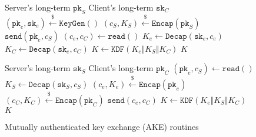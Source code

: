 \documentclass[journal=tches,submission]{iacrtrans}
\newcommand{\keygen}{\texttt{KeyGen}}
\newcommand{\encap}{\texttt{Encap}}
\newcommand{\decap}{\texttt{Decap}}
\newcommand{\pk}{\texttt{pk}}
\newcommand{\sk}{\texttt{sk}}
\newcommand{\leftsample}{\stackrel{\$}{\leftarrow}}
\begin{document}
\begin{figure}[h]
    \centering
    \begin{minipage}[b]{0.49\textwidth}
        \begin{algorithm}[H]
            \caption*{$\texttt{AKE}_\texttt{C}(\pk_S, \sk_C)$}
            \begin{algorithmic}[1]
                \Require Server's long-term $\pk_S$
                \Require Client's long-term $\sk_C$
                \State $(\pk_e, \sk_e) \leftsample \keygen()$
                \State $(c_S, K_S) \leftsample \encap(\pk_S)$
                \State $\texttt{send}(\pk_e, c_S)$
                \State $(c_e, c_C) \leftarrow \texttt{read}()$
                \State $K_e \leftarrow \decap(\sk_e, c_e)$
                \State $K_C \leftarrow \decap(\sk_e, c_C)$
                \State $K \leftarrow \texttt{KDF}(K_e \Vert K_S \Vert K_C)$
                \State \Return $K$
            \end{algorithmic}
        \end{algorithm}
    \end{minipage}
    \begin{minipage}[b]{0.49\textwidth}
        \begin{algorithm}[H]
            \caption*{$\texttt{AKE}_\texttt{S}(\sk_S, \pk_C)$}
            \begin{algorithmic}[1]
                \Require Server's long-term $\sk_S$
                \Require Client's long-term $\pk_C$
                \State $(\pk_e, c_S) \leftarrow \texttt{read}()$
                \State $K_S \leftarrow \decap(\sk_S, c_S)$
                \State $(c_e, K_e) \leftsample \encap(\pk_e)$
                \State $(c_C, K_C) \leftsample \encap(\pk_C)$
                \State $\texttt{send}(c_e, c_C)$
                \State $K \leftarrow \texttt{KDF}(K_e \Vert K_S \Vert K_C)$
                \State \Return $K$
            \end{algorithmic}
        \end{algorithm}
    \end{minipage}
    
    \caption{Mutually authenticated key exchange (AKE) routines}\label{fig:ake-routines}
\end{figure}
\end{document}
